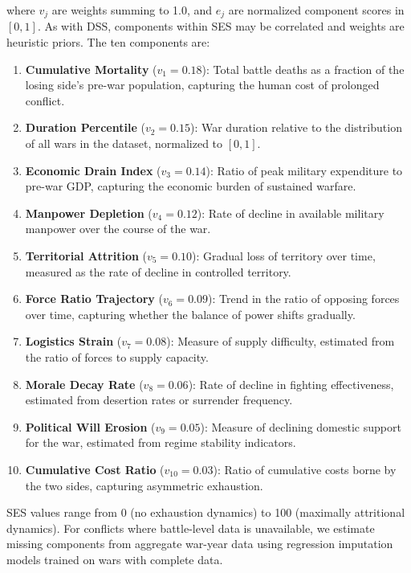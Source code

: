 \noindent where $v_j$ are weights summing to 1.0, and $e_j$ are normalized component scores in $[0, 1]$. As with DSS, components within SES may be correlated and weights are heuristic priors. The ten components are:

\begin{enumerate}
    \item \textbf{Cumulative Mortality} ($v_1 = 0.18$): Total battle deaths as a fraction of the losing side's pre-war population, capturing the human cost of prolonged conflict.
    \item \textbf{Duration Percentile} ($v_2 = 0.15$): War duration relative to the distribution of all wars in the dataset, normalized to $[0, 1]$.
    \item \textbf{Economic Drain Index} ($v_3 = 0.14$): Ratio of peak military expenditure to pre-war GDP, capturing the economic burden of sustained warfare.
    \item \textbf{Manpower Depletion} ($v_4 = 0.12$): Rate of decline in available military manpower over the course of the war.
    \item \textbf{Territorial Attrition} ($v_5 = 0.10$): Gradual loss of territory over time, measured as the rate of decline in controlled territory.
    \item \textbf{Force Ratio Trajectory} ($v_6 = 0.09$): Trend in the ratio of opposing forces over time, capturing whether the balance of power shifts gradually.
    \item \textbf{Logistics Strain} ($v_7 = 0.08$): Measure of supply difficulty, estimated from the ratio of forces to supply capacity.
    \item \textbf{Morale Decay Rate} ($v_8 = 0.06$): Rate of decline in fighting effectiveness, estimated from desertion rates or surrender frequency.
    \item \textbf{Political Will Erosion} ($v_9 = 0.05$): Measure of declining domestic support for the war, estimated from regime stability indicators.
    \item \textbf{Cumulative Cost Ratio} ($v_{10} = 0.03$): Ratio of cumulative costs borne by the two sides, capturing asymmetric exhaustion.
\end{enumerate}

SES values range from 0 (no exhaustion dynamics) to 100 (maximally attritional dynamics). For conflicts where battle-level data is unavailable, we estimate missing components from aggregate war-year data using regression imputation models trained on wars with complete data.

